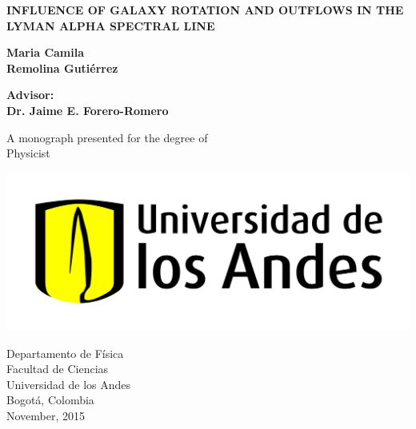 

\setcounter{page}{1}

\newpage

\thispagestyle{empty}
\begin{center}
  \vspace*{1cm}
  {\LARGE \bf INFLUENCE OF GALAXY ROTATION AND OUTFLOWS IN THE LYMAN ALPHA SPECTRAL LINE}

  \vspace*{2cm}
  {\LARGE\bf Maria Camila \\Remolina Guti\'errez}

  \vspace*{1cm}
  {\LARGE\bf Advisor: \\ Dr. Jaime E. Forero-Romero}

  \vfill
  {\Large A monograph presented for the degree of\\
         [1mm] Physicist}
  \vspace*{0.2cm}
  
   \begin{center}
   \includegraphics[scale=0.11]{figures/uniandes.jpg}
   \end{center}
  \vspace*{-0.4cm}   
  {\large Departamento de F\'isica\\
		  [-3mm] Facultad de Ciencias\\
          [-3mm] Universidad de los Andes\\
          [-3mm] Bogot\'a, Colombia\\
          [1mm]  November, 2015}

\end{center}

